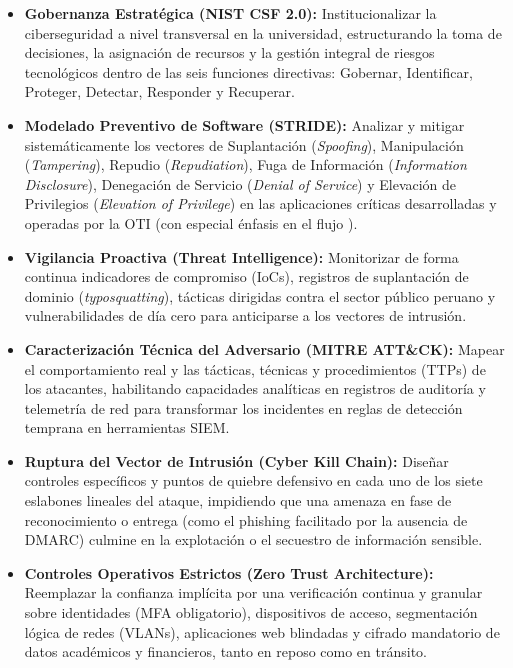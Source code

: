 \begin{itemize}[itemsep=3pt,topsep=2pt,parsep=0pt]
    \item \textbf{Gobernanza Estratégica (NIST CSF 2.0):} Institucionalizar la ciberseguridad a nivel transversal en la universidad, estructurando la toma de decisiones, la asignación de recursos y la gestión integral de riesgos tecnológicos dentro de las seis funciones directivas: Gobernar, Identificar, Proteger, Detectar, Responder y Recuperar.

    \item \textbf{Modelado Preventivo de Software (STRIDE):} Analizar y mitigar sistemáticamente los vectores de Suplantación (\textit{Spoofing}), Manipulación (\textit{Tampering}), Repudio (\textit{Repudiation}), Fuga de Información (\textit{Information Disclosure}), Denegación de Servicio (\textit{Denial of Service}) y Elevación de Privilegios (\textit{Elevation of Privilege}) en las aplicaciones críticas desarrolladas y operadas por la OTI (con especial énfasis en el flujo ).

    \item \textbf{Vigilancia Proactiva (Threat Intelligence):} Monitorizar de forma continua indicadores de compromiso (IoCs), registros de suplantación de dominio (\textit{typosquatting}), tácticas dirigidas contra el sector público peruano y vulnerabilidades de día cero para anticiparse a los vectores de intrusión.

    \item \textbf{Caracterización Técnica del Adversario (MITRE ATT\&CK):} Mapear el comportamiento real y las tácticas, técnicas y procedimientos (TTPs) de los atacantes, habilitando capacidades analíticas en registros de auditoría y telemetría de red para transformar los incidentes en reglas de detección temprana en herramientas SIEM.

    \item \textbf{Ruptura del Vector de Intrusión (Cyber Kill Chain):} Diseñar controles específicos y puntos de quiebre defensivo en cada uno de los siete eslabones lineales del ataque, impidiendo que una amenaza en fase de reconocimiento o entrega (como el phishing facilitado por la ausencia de DMARC) culmine en la explotación o el secuestro de información sensible.

    \item \textbf{Controles Operativos Estrictos (Zero Trust Architecture):} Reemplazar la confianza implícita por una verificación continua y granular sobre identidades (MFA obligatorio), dispositivos de acceso, segmentación lógica de redes (VLANs), aplicaciones web blindadas y cifrado mandatorio de datos académicos y financieros, tanto en reposo como en tránsito.
\end{itemize}

